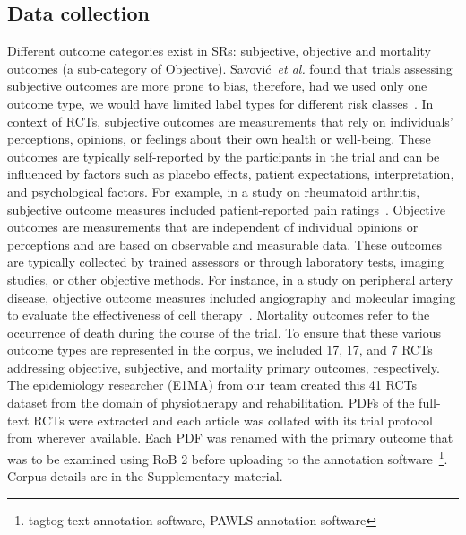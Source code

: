 \documentclass[sn-mathphys,Numbered]{sn-jnl}%
\theoremstyle{thmstyleone}%
\theoremstyle{thmstyletwo}%
\theoremstyle{thmstylethree}%
\begin{document}
\subsection{Data collection}
\label{data}
%
Different outcome categories exist in SRs: subjective, objective and mortality outcomes (a sub-category of Objective).
Savović~\textit{et al.} found that trials assessing subjective outcomes are more prone to bias, therefore, had we used only one outcome type, we would have limited label types for different risk classes~\cite{page2016empirical,savovic2018association}.
In context of RCTs, subjective outcomes are measurements that rely on individuals' perceptions, opinions, or feelings about their own health or well-being.
These outcomes are typically self-reported by the participants in the trial and can be influenced by factors such as  placebo effects, patient expectations, interpretation, and psychological factors.
For example, in a study on rheumatoid arthritis, subjective outcome measures included patient-reported pain ratings~\cite{vollert2020assessment}.
Objective outcomes are measurements that are independent of individual opinions or perceptions and are based on observable and measurable data.
These outcomes are typically collected by trained assessors or through laboratory tests, imaging studies, or other objective methods.
For instance, in a study on peripheral artery disease, objective outcome measures included angiography and molecular imaging to evaluate the effectiveness of cell therapy~\cite{grimaldi2016imaging}.
Mortality outcomes refer to the occurrence of death during the course of the trial.
To ensure that these various outcome types are represented in the corpus, we included 17, 17, and 7 RCTs addressing objective, subjective, and mortality primary outcomes, respectively.
The epidemiology researcher (E1MA) from our team created this 41 RCTs dataset from the domain of physiotherapy and rehabilitation.
PDFs of the full-text RCTs were extracted and each article was collated with its trial protocol from wherever available.
Each PDF was renamed with the primary outcome that was to be examined using RoB 2 before uploading to the annotation software~\footnote{tagtog text annotation software, PAWLS annotation software}.
Corpus details are in the Supplementary material.
%
%
%
\end{document}
